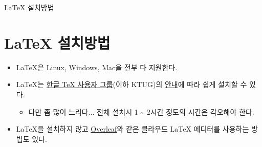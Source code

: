 \documentclass{beamer}
\begin{document}
\begin{frame}{\LaTeX{} 설치방법}
    \section{\LaTeX{} 설치방법}
    \begin{itemize}
        \item \LaTeX{}은 Linux, Windows, Mac을 전부 다 지원한다.
        \item \LaTeX{}는 \href{http://www.ktug.org/}{한글 \TeX{} 사용자 그룹}(이하 KTUG)의 \href{http://www.ktug.org/xe/index.php?mid=Install}{안내}에 따라 쉽게 설치할 수 있다.
            \begin{itemize}
                \item 다만 좀 많이 느리다... 전체 설치시 1 \~{} 2시간 정도의 시간은 각오해야 한다.
            \end{itemize}
        \item \LaTeX{}을 설치하지 않고 \href{https://www.overleaf.com/}{Overleaf}와 같은 클라우드 \LaTeX{} 에디터를 사용하는 방법도 있다.
    \end{itemize}
\end{frame}
\end{document}
